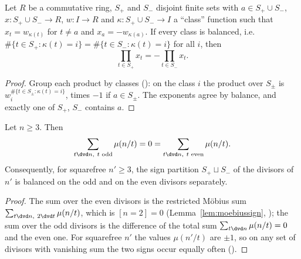 \begin{lemma}
  \label{lem:li-classes}
  \leanok
  Let $R$ be a commutative ring, $S_+$ and $S_-$ disjoint finite sets with $a \in S_+ \cup S_-$,
  $x \colon S_+ \cup S_- \to R$, $w \colon I \to R$ and $\kappa \colon S_+ \cup S_- \to I$ a
  ``class'' function such that $x_t = w_{\kappa(t)}$ for $t \ne a$ and $x_a = -w_{\kappa(a)}$. If
  every class is balanced, i.e.\ $\#\{t \in S_+ : \kappa(t) = i\} = \#\{t \in S_- : \kappa(t) = i\}$
  for all $i$, then
  \[ \prod_{t \in S_+} x_t = -\prod_{t \in S_-} x_t. \]
\end{lemma}
\begin{proof}
  \leanok
  Group each product by classes (): on the class $i$ the product over
  $S_\pm$ is $w_i^{\#\{t \in S_\pm : \kappa(t) = i\}}$, times $-1$ if $a \in S_\pm$. The exponents
  agree by balance, and exactly one of $S_+$, $S_-$ contains $a$.
\end{proof}

\begin{lemma}
  \label{lem:li-parity}
  \leanok
  Let $n \ge 3$. Then
  \[ \sum_{t \dvd n,\ t \text{ odd}} \mu(n/t) = 0
     = \sum_{t \dvd n,\ t \text{ even}} \mu(n/t). \]
  Consequently, for squarefree $n' \ge 3$, the sign partition $S_+ \sqcup S_-$ of the divisors of
  $n'$ is balanced on the odd and on the even divisors separately.
\end{lemma}
\begin{proof}
  \leanok
  The sum over the even divisors is the restricted Möbius sum $\sum_{t \dvd n,\ 2 \dvd t} \mu(n/t)$,
  which is $[n = 2] = 0$ (Lemma~\ref{lem:moebiussign},
  ); the sum over the odd divisors is the
  difference of the total sum $\sum_{t \dvd n} \mu(n/t) = 0$ and the even one. For squarefree
  $n'$ the values $\mu(n'/t)$ are $\pm 1$, so on any set of divisors with vanishing sum the two
  signs occur equally often ().
\end{proof}


